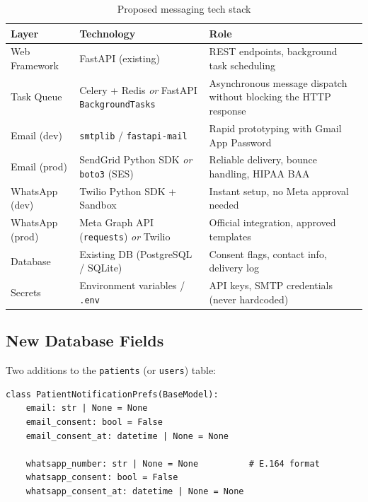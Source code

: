 \documentclass[12pt,a4paper]{article}
\newcommand{\codeinline}[1]{\texttt{\small\color{accent}#1}}
\begin{document}
\begin{table}[h!]
\centering
\begin{tabularx}{\linewidth}{l l X}
\toprule
\textbf{Layer} & \textbf{Technology} & \textbf{Role} \\
\midrule
\rowcolor{rowA}
Web Framework & FastAPI (existing) &
    REST endpoints, background task scheduling \\
Task Queue & Celery + Redis \emph{or} FastAPI \codeinline{BackgroundTasks} &
    Asynchronous message dispatch without blocking the HTTP response \\
\rowcolor{rowA}
Email (dev) & \codeinline{smtplib} / \codeinline{fastapi-mail} &
    Rapid prototyping with Gmail App Password \\
Email (prod) & SendGrid Python SDK \emph{or} \codeinline{boto3} (SES) &
    Reliable delivery, bounce handling, HIPAA BAA \\
\rowcolor{rowA}
WhatsApp (dev) & Twilio Python SDK + Sandbox &
    Instant setup, no Meta approval needed \\
WhatsApp (prod) & Meta Graph API (\codeinline{requests}) \emph{or} Twilio &
    Official integration, approved templates \\
\rowcolor{rowA}
Database & Existing DB (PostgreSQL / SQLite) &
    Consent flags, contact info, delivery log \\
Secrets & Environment variables / \codeinline{.env} &
    API keys, SMTP credentials (never hardcoded) \\
\bottomrule
\end{tabularx}
\caption{Proposed messaging tech stack}
\end{table}

\subsection{New Database Fields}

Two additions to the \codeinline{patients} (or \codeinline{users}) table:

\begin{lstlisting}[style=python, caption={Pydantic schema additions (example)}]
class PatientNotificationPrefs(BaseModel):
    email: str | None = None
    email_consent: bool = False
    email_consent_at: datetime | None = None

    whatsapp_number: str | None = None          # E.164 format
    whatsapp_consent: bool = False
    whatsapp_consent_at: datetime | None = None
\end{lstlisting}
\end{document}

